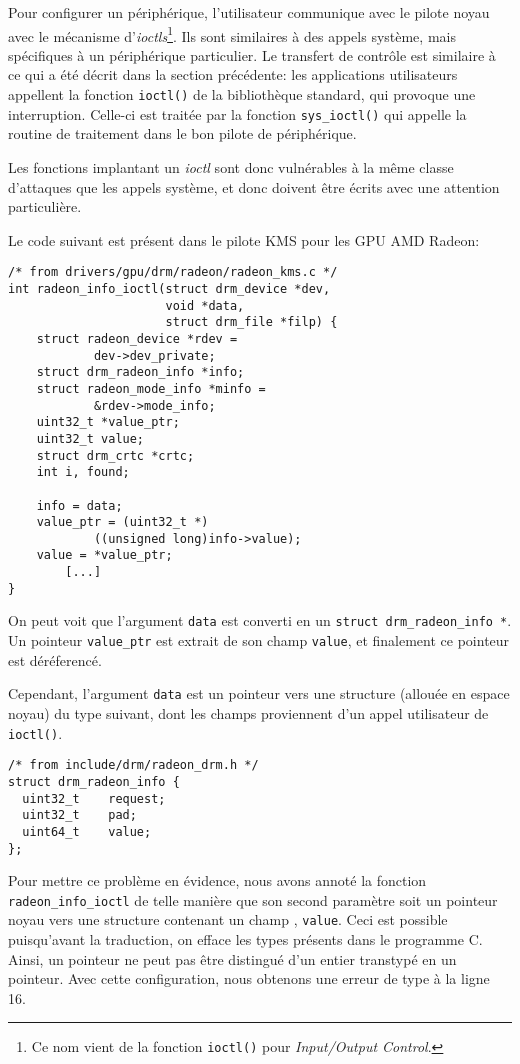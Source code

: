 Pour configurer un périphérique, l'utilisateur communique avec le pilote noyau
avec le mécanisme d'\emph{ioctls}\footnote{
  Ce nom vient de la fonction \verb!ioctl()! pour
  \emph{Input/Output Control}.
}.
Ils sont similaires à des appels système, mais spécifiques à un périphérique
particulier. Le transfert de contrôle est similaire à ce qui a été décrit dans
la section précédente: les applications utilisateurs appellent la fonction
\texttt{ioctl()} de la bibliothèque standard, qui provoque une interruption.
Celle-ci est traitée par la fonction \texttt{sys\_ioctl()} qui appelle la
routine de traitement dans le bon pilote de périphérique.

Les fonctions implantant un \emph{ioctl} sont donc vulnérables à la
même classe d'attaques que les appels système, et donc doivent être écrits avec
une attention particulière.

Le code suivant est présent dans le pilote KMS pour les GPU AMD Radeon:

\begin{verbatim}
/* from drivers/gpu/drm/radeon/radeon_kms.c */
int radeon_info_ioctl(struct drm_device *dev,
                      void *data,
                      struct drm_file *filp) {
	struct radeon_device *rdev =
            dev->dev_private;
	struct drm_radeon_info *info;
	struct radeon_mode_info *minfo =
            &rdev->mode_info;
	uint32_t *value_ptr;
	uint32_t value;
	struct drm_crtc *crtc;
	int i, found;

	info = data;
	value_ptr = (uint32_t *)
            ((unsigned long)info->value);
	value = *value_ptr;
        [...]
}
\end{verbatim}

On peut voit que l'argument \texttt{data} est converti en un \texttt{struct
drm\_radeon\_info *}. Un pointeur \texttt{value\_ptr} est extrait de son champ
\texttt{value}, et finalement ce pointeur est déréferencé.

Cependant, l'argument \texttt{data} est un pointeur vers une structure (allouée
en espace noyau) du type suivant, dont les champs proviennent d'un appel
utilisateur de \verb!ioctl()!.

\begin{verbatim}
/* from include/drm/radeon_drm.h */
struct drm_radeon_info {
  uint32_t    request;
  uint32_t    pad;
  uint64_t    value;
};
\end{verbatim}

Pour mettre ce problème en évidence, nous avons annoté la fonction
\texttt{radeon\_info\_ioctl} de telle manière que son second paramètre soit un
pointeur noyau vers une structure contenant un champ \qUser, \texttt{value}.
Ceci est possible puisqu'avant la traduction, on efface les types présents dans
le programme C. Ainsi, un pointeur ne peut pas être distingué d'un entier
transtypé en un pointeur. Avec cette configuration, nous obtenons une erreur de
type à la ligne 16.

